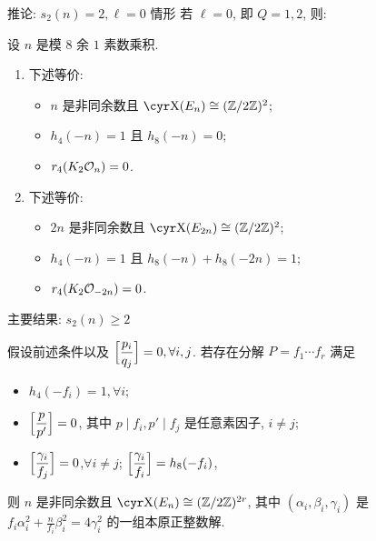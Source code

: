 \documentclass[aspectratio=169]{ctexbeamer}
\renewcommand\aleg[2]{\Bigl[\dfrac{{#1}}{#2}\Bigr]}
\begin{document}
\begin{frame}{推论: $s_2(n)=2,\ell=0$ 情形}
	\onslide<+->
	若 $\ell=0$, 即 $Q=1,2$, 则:
	\onslide<+->
	\begin{corollary}
		设 $n$ 是模 $8$ 余 $1$ 素数乘积.
		\begin{enumerate}
			\item 下述等价:
			\begin{itemize}[<*>]
				\item $n$ 是非同余数且 $\Sha(E_n)\cong(\BZ/2\BZ)^2$;
				\item $h_4(-n)=1$ 且 $h_8(-n)=0$;
				\item $r_4(K_2{\mathcal{O}}_n)=0$.
			\end{itemize}
			\item 下述等价:
			\begin{itemize}[<*>]
				\item $2n$ 是非同余数且 $\Sha(E_{2n})\cong(\BZ/2\BZ)^2$;
				\item $h_4(-n)=1$ 且 $h_8(-n)+h_8(-2n)=1$;
				\item $r_4(K_2{\mathcal{O}}_{-2n})=0$.
			\end{itemize}
		\end{enumerate}
	\end{corollary}
\end{frame}


\begin{frame}{主要结果: $s_2(n)\ge 2$}
	\begin{theorem}
		假设前述条件以及 $\aleg{p_i}{q_j}=0, \forall i,j$.
		若存在分解 $P=f_1\cdots f_r$ 满足
		\begin{itemize}[<*>]
			\item $h_4(-f_i)=1,\forall i$;
			\item $\aleg{p}{p'}=0$, 其中 $p\mid f_i,p'\mid f_j$ 是任意素因子, $i\ne j$;
			\item $\aleg{\gamma_i}{f_j}=0$,$\forall i\ne j$; $\aleg{\gamma_i}{f_i}=h_8(-f_i)$,
		\end{itemize}
		则 $n$ 是非同余数且 $\Sha(E_n)\cong(\BZ/2\BZ)^{2r}$,
		其中 $(\alpha_i,\beta_i,\gamma_i)$ 是  $f_i\alpha_i^2+\frac{n}{f_i}\beta_i^2=4\gamma_i^2$ 的一组本原正整数解.
	\end{theorem}
\end{frame}
\end{document}
